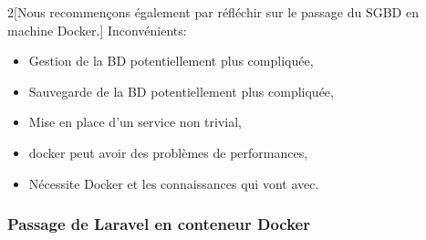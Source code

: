\documentclass[
    iai, %
    il, %
]{heig-tb}
\begin{document}
\begin{multicols}{2}[Nous recommençons également par réfléchir sur le passage du SGBD en machine Docker.]
    Inconvénients:
    \begin{itemize}
        \item Gestion de la BD potentiellement plus compliquée,
        \item Sauvegarde de la BD potentiellement plus compliquée,
        \item Mise en place d'un service non trivial,
        \item \Gls{docker} peut avoir des problèmes de performances, \cite{labrecque}
        \item Nécessite Docker et les connaissances qui vont avec. \cite{labrecque}
    \end{itemize}
\end{multicols}

\subsubsection{Passage de Laravel en conteneur Docker}
\end{document}

